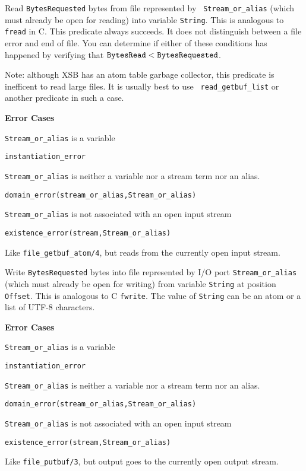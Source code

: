 \begin{description}
Read {\tt BytesRequested} bytes from file represented by {\tt
Stream\_or\_alias} (which must already be open for reading) into
variable {\tt String}. This is analogous to {\tt fread} in C.  This
predicate always succeeds. It does not distinguish between a file
error and end of file.  You can determine if either of these
conditions has happened by verifying that $\tt BytesRead <
BytesRequested$.

Note: although XSB has an atom table garbage collector, this predicate
is inefficent to read large files.  It is usually best to use {\tt
  read\_getbuf\_list} or another predicate in such a  case.

{\bf Error Cases} 
\bi
\item 	{\tt Stream\_or\_alias} is a variable
\bi
\item {\tt instantiation\_error}
\ei
\item 	{\tt Stream\_or\_alias} is neither a variable nor a stream term nor an alias.
\bi
\item 	{\tt domain\_error(stream\_or\_alias,Stream\_or\_alias)}
\ei
\item 	{\tt Stream\_or\_alias} is not associated with an open input stream
\bi
\item 	{\tt existence\_error(stream,Stream\_or\_alias)}
\ei
\ei

%
Like \verb|file_getbuf_atom/4|, but reads from the currently open input stream.


Write {\tt BytesRequested} bytes into file represented by I/O port
{\tt Stream\_or\_alias} (which must already be open for writing) from
variable {\tt String} at position {\tt Offset}. This is analogous to C
{\tt fwrite}.  The value of {\tt String} can be an atom or a list of
UTF-8 characters.

{\bf Error Cases} 
\bi
\item 	{\tt Stream\_or\_alias} is a variable
\bi
\item {\tt instantiation\_error}
\ei
\item 	{\tt Stream\_or\_alias} is neither a variable nor a stream term nor an alias.
\bi
\item 	{\tt domain\_error(stream\_or\_alias,Stream\_or\_alias)}
\ei
\item 	{\tt Stream\_or\_alias} is not associated with an open input stream
\bi
\item 	{\tt existence\_error(stream,Stream\_or\_alias)}
\ei
\ei

%
Like \verb|file_putbuf/3|, but output goes to the currently open output stream.


\end{description}

